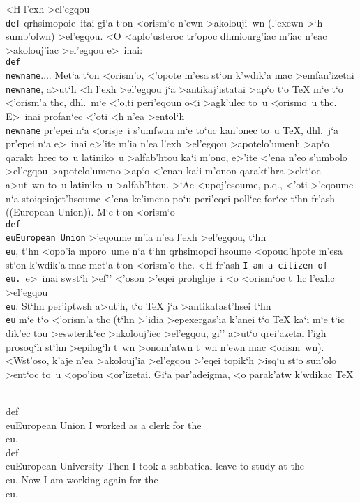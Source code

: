 <H l'exh >el'egqou {\tt\\def} qrhsimopoie~itai gi`a t`on <orism`o n'ewn
>akolouji~wn (l'exewn >`h sumb'olwn) >el'egqou.  <O <aplo'u\-ste\-roc
tr'opoc dhmiourg'iac m'iac n'eac >akolouj'iac >el'egqou e>~inai: {\tt
\\def\\newname\lb$\ldots$\rb}. Met`a t`on <orism'o, <'opote m'esa st`on
k'wdik'a mac >emfan'izetai {\tt \\newname}, a>ut`h <h l'exh >el'egqou
j`a >anti\-kaj'i\-statai >ap`o t`o {\rm \TeX} m`e t`o {\tengs
<'orism'a\/} thc, dhl.\ m`e <'o,ti peri'eqoun o<i >agk'ulec to~u
<orismo~u thc.   E>~inai profan`ec <'oti <h n'ea >entol`h {\tt
\\newname} pr'epei n`a <orisje~i s'umfwna m`e to`uc kan'onec to~u {\rm
\TeX}, dhl.\ j`a pr'epei n`a e>~inai e>'ite m'ia n'ea l'exh >el'egqou
>apotelo'umenh >ap`o qarakt~hrec to~u latiniko~u >alfab'htou ka`i m'ono,
 e>'ite  <'ena n'eo s'umbolo >el'egqou >apotelo'umeno >ap`o <'enan ka`i
m'onon qarakt'hra >ekt`oc a>ut~wn to~u latiniko~u >alfab'htou.  >`Ac
<upoj'esoume, p.q., <'oti >'eqoume n`a stoiqeiojet'hsoume <'ena ke'imeno
po`u peri'eqei poll`ec for`ec t`hn fr'ash (({\rm European Union})).  M`e
t`on <orism`o {\tt \\def\\eu\lb European Union\rb} >'eqoume m'ia n'ea
l'exh >el'egqou, t`hn {\tt \\eu}, t`hn <opo'ia mporo~ume n`a t`hn
qrhsimopoi'hsoume <opoud'hpote m'esa st`on k'wdik'a mac met`a t`on
<orism'o thc.  <H fr'ash {\tt I am a citizen of \\eu.}\ e>~inai swst`h
>ef'' <'oson >'eqei prohghje~i <o <orism`oc t~hc l'exhc >el'egqou
{\tt\\eu}.  St`hn per'i\-ptw\-sh a>ut'h, t`o {\rm\TeX} j`a
>antikatast'hsei t`hn {\tt\\eu} m`e t`o <'orism'a thc (t`hn >'idia
>epexergas'ia k'anei t`o {\rm\TeX} ka`i m`e t`ic dik'ec tou >eswterik`ec
>akolouj'iec >el'egqou, gi'' a>ut`o qrei'azetai l'igh prosoq`h st`hn
>epilog`h t~wn >onom'atwn t~wn n'ewn mac <orism~wn).  <Wst'oso, k'aje
n'ea >akolouj'ia >el'egqou >'eqei topik`h >isq`u st`o sun'olo >ent`oc
to~u <opo'iou <or'izetai. Gi`a par'adeigma, <o parak'atw k'wdikac
{\rm\TeX}

\beginuser
\\def\\eu\lb European Union\rb
I worked as a clerk for the \\eu.
\lb
\\def\\eu\lb European University\rb
Then I took a sabbatical leave to study at the \\eu.
\rb
Now I am working again for the \\eu.
\enduser

